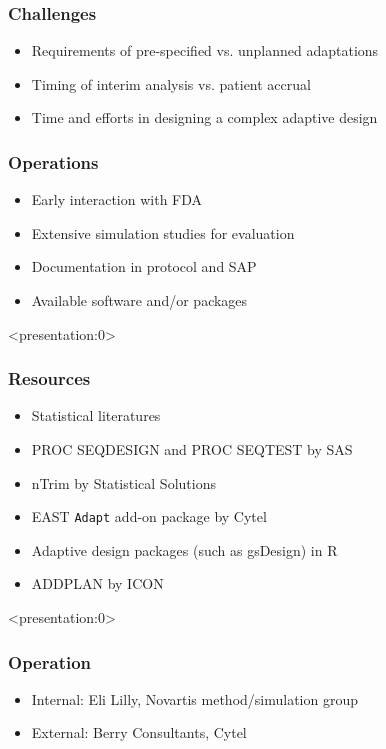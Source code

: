\documentclass{beamer}
\begin{document}
\begin{frame}
	\frametitle{Challenges}
	\begin{itemize}
		\item Requirements of pre-specified vs. unplanned adaptations
		\item Timing of interim analysis vs. patient accrual
		\item Time and efforts in designing a complex adaptive design
	\end{itemize}
\end{frame}

\begin{frame}
	\frametitle{Operations}
	\begin{itemize}
		\item Early interaction with FDA
		\item Extensive simulation studies for evaluation
		\item Documentation in protocol and SAP
		\item Available software and/or packages
	\end{itemize}
\end{frame}
\begin{frame}<presentation:0>
	\frametitle{Resources}
	\begin{itemize}
		\item Statistical literatures
		\item PROC SEQDESIGN and PROC SEQTEST by SAS
       \item nTrim by Statistical Solutions 
		\item EAST \texttt{Adapt} add-on package by Cytel
		\item Adaptive design packages (such as gsDesign) in R
		\item ADDPLAN by ICON
	\end{itemize}
\end{frame}\addtocounter{framenumber}{-1}
\begin{frame}<presentation:0>
	\frametitle{Operation}
	\begin{itemize}
		\item Internal: Eli Lilly, Novartis method/simulation group
		\item External: Berry Consultants, Cytel
	\end{itemize}
\end{frame}\addtocounter{framenumber}{-1}
\end{document}
